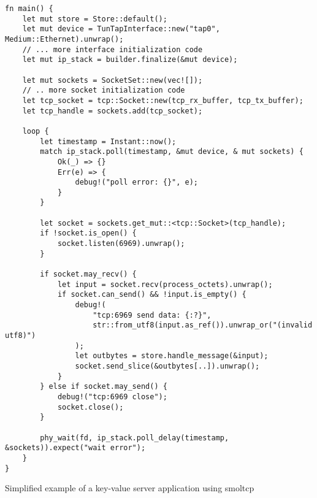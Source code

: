 \begin{codefigure}[H]
    \centering
    
\begin{verbatim}
fn main() {
    let mut store = Store::default();
    let mut device = TunTapInterface::new("tap0", Medium::Ethernet).unwrap();
    // ... more interface initialization code
    let mut ip_stack = builder.finalize(&mut device);

    let mut sockets = SocketSet::new(vec![]);
    // .. more socket initialization code
    let tcp_socket = tcp::Socket::new(tcp_rx_buffer, tcp_tx_buffer);
    let tcp_handle = sockets.add(tcp_socket);

    loop {
        let timestamp = Instant::now();
        match ip_stack.poll(timestamp, &mut device, & mut sockets) {
            Ok(_) => {}
            Err(e) => {
                debug!("poll error: {}", e);
            }
        }

        let socket = sockets.get_mut::<tcp::Socket>(tcp_handle);
        if !socket.is_open() {
            socket.listen(6969).unwrap();
        }

        if socket.may_recv() {
            let input = socket.recv(process_octets).unwrap();
            if socket.can_send() && !input.is_empty() {
                debug!(
                    "tcp:6969 send data: {:?}",
                    str::from_utf8(input.as_ref()).unwrap_or("(invalid utf8)")
                );
                let outbytes = store.handle_message(&input);
                socket.send_slice(&outbytes[..]).unwrap();
            }
        } else if socket.may_send() {
            debug!("tcp:6969 close");
            socket.close();
        }

        phy_wait(fd, ip_stack.poll_delay(timestamp, &sockets)).expect("wait error");
    }
}
\end{verbatim}
    \caption{Simplified example of a key-value server application using smoltcp}
    \label{fig:oldTopLevel}
\end{codefigure}


